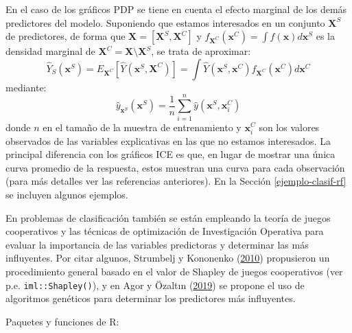 \documentclass[
  spanish,
]{book}
\theoremstyle{break}
\theoremstyle{definition}
\theoremstyle{definition}
\theoremstyle{definition}
\theoremstyle{remark}
\begin{document}
En el caso de los gráficos PDP se tiene en cuenta el efecto marginal de los demás predictores del modelo.
Suponiendo que estamos interesados en un conjunto \(\mathbf X^S\) de predictores, de forma que \(\mathbf X = [\mathbf X^S, \mathbf X^C]\) y \(f_{\mathbf X^C}(\mathbf x^C) = \int f(\mathbf x) d\mathbf x^S\) es la densidad marginal de \(\mathbf X^C = \mathbf X \setminus \mathbf X^S\), se trata de aproximar:
\[\hat Y_S(\mathbf x^S) = E_{\mathbf X^C}\left[\hat{Y}(\mathbf x^S,\mathbf X^C)\right]=\int\hat{Y}(\mathbf x^S,\mathbf x^C)f_{\mathbf X^C}(\mathbf x^C)d\mathbf x^C\]
mediante:
\[\hat{y}_{\mathbf x^S}(\mathbf x^S)=\frac{1}{n}\sum_{i=1}^n\hat{y}(\mathbf x^S, \mathbf x^C_i)\]
donde \(n\) en el tamaño de la muestra de entrenamiento y \(\mathbf x^C_i\) son los valores observados de las variables explicativas en las que no estamos interesados.
La principal diferencia con los gráficos ICE es que, en lugar de mostrar una única curva promedio de la respuesta, estos muestran una curva para cada observación (para más detalles ver las referencias anteriores).
En la Sección \ref{ejemplo-clasif-rf} se incluyen algunos ejemplos.

En problemas de clasificación también se están empleando la teoría de juegos cooperativos y las técnicas de optimización de Investigación Operativa para evaluar la importancia de las variables predictoras y determinar las más influyentes.
Por citar algunos, Strumbelj y Kononenko (\protect\hyperlink{ref-strumbelj2010efficient}{2010}) propusieron un procedimiento general basado en el valor de Shapley de juegos cooperativos (ver p.e. \texttt{iml::Shapley()}), y en Agor y Özaltın (\protect\hyperlink{ref-agor2019feature}{2019}) se propone el uso de algoritmos genéticos para determinar los predictores más influyentes.

Paquetes y funciones de R:
\end{document}
